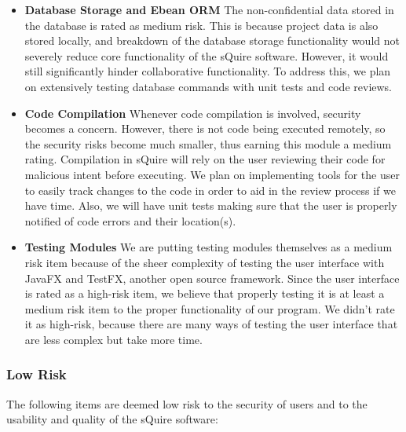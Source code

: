 \documentclass[twoside,letterpaper]{article}
\begin{document}
\begin{itemize}
	\item \textbf{Database Storage and Ebean ORM} 
	The non-confidential data stored in the database is rated as medium risk. This is because project data is also stored locally, and breakdown of the database storage functionality would not severely reduce core functionality of the sQuire software. However, it would still significantly hinder collaborative functionality. To address this, we plan on extensively testing database commands with unit tests and code reviews.
	
	\item \textbf{Code Compilation} 
	Whenever code compilation is involved, security becomes a concern. However, there is not code being executed remotely, so the security risks become much smaller, thus earning this module a medium rating. Compilation in sQuire will rely on the user reviewing their code for malicious intent before executing. We plan on implementing tools for the user to easily track changes to the code in order to aid in the review process if we have time. Also, we will have unit tests making sure that the user is properly notified of code errors and their location(s).
	
	\item \textbf{Testing Modules} 
	We are putting testing modules themselves as a medium risk item because of the sheer complexity of testing the user interface with JavaFX and TestFX, another open source framework. Since the user interface is rated as a high-risk item, we believe that properly testing it is at least a medium risk item to the proper functionality of our program. We didn't rate it as high-risk, because there are many ways of testing the user interface that are less complex but take more time.
\end{itemize}

\subsubsection{Low Risk}

The following items are deemed low risk to the security of users and to the usability and quality of the sQuire software:
\end{document}

